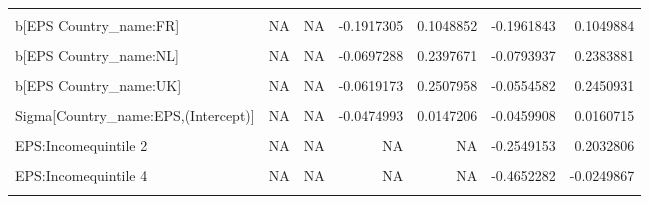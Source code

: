 \begin{table}
\begin{tabular}[t]{lrrrrrr}
\cellcolor{gray!10}{b[EPS Country\_name:CH]} & \cellcolor{gray!10}{NA} & \cellcolor{gray!10}{NA} & \cellcolor{gray!10}{-0.1840604} & \cellcolor{gray!10}{0.1098069} & \cellcolor{gray!10}{-0.1875721} & \cellcolor{gray!10}{0.1005161}\\
b[EPS Country\_name:FR] & NA & NA & -0.1917305 & 0.1048852 & -0.1961843 & 0.1049884\\
\cellcolor{gray!10}{b[EPS Country\_name:IL]} & \cellcolor{gray!10}{NA} & \cellcolor{gray!10}{NA} & \cellcolor{gray!10}{-0.3029172} & \cellcolor{gray!10}{0.2764548} & \cellcolor{gray!10}{-0.2903695} & \cellcolor{gray!10}{0.2643187}\\
b[EPS Country\_name:NL] & NA & NA & -0.0697288 & 0.2397671 & -0.0793937 & 0.2383881\\
\addlinespace
\cellcolor{gray!10}{b[EPS Country\_name:SE]} & \cellcolor{gray!10}{NA} & \cellcolor{gray!10}{NA} & \cellcolor{gray!10}{-0.2553831} & \cellcolor{gray!10}{0.0586896} & \cellcolor{gray!10}{-0.2560886} & \cellcolor{gray!10}{0.0644612}\\
b[EPS Country\_name:UK] & NA & NA & -0.0619173 & 0.2507958 & -0.0554582 & 0.2450931\\
\cellcolor{gray!10}{b[EPS Country\_name:US]} & \cellcolor{gray!10}{NA} & \cellcolor{gray!10}{NA} & \cellcolor{gray!10}{-0.2257754} & \cellcolor{gray!10}{0.1066595} & \cellcolor{gray!10}{-0.2108101} & \cellcolor{gray!10}{0.1042208}\\
Sigma[Country\_name:EPS,(Intercept)] & NA & NA & -0.0474993 & 0.0147206 & -0.0459908 & 0.0160715\\
\cellcolor{gray!10}{Sigma[Country\_name:EPS,EPS]} & \cellcolor{gray!10}{NA} & \cellcolor{gray!10}{NA} & \cellcolor{gray!10}{0.0016993} & \cellcolor{gray!10}{0.0670086} & \cellcolor{gray!10}{0.0013740} & \cellcolor{gray!10}{0.0629157}\\
\addlinespace
EPS:Incomequintile 2 & NA & NA & NA & NA & -0.2549153 & 0.2032806\\
\cellcolor{gray!10}{EPS:Incomequintile 3} & \cellcolor{gray!10}{NA} & \cellcolor{gray!10}{NA} & \cellcolor{gray!10}{NA} & \cellcolor{gray!10}{NA} & \cellcolor{gray!10}{-0.4682143} & \cellcolor{gray!10}{-0.0185617}\\
EPS:Incomequintile 4 & NA & NA & NA & NA & -0.4652282 & -0.0249867\\
\cellcolor{gray!10}{EPS:Incomequintile 5} & \cellcolor{gray!10}{NA} & \cellcolor{gray!10}{NA} & \cellcolor{gray!10}{NA} & \cellcolor{gray!10}{NA} & \cellcolor{gray!10}{-0.4494179} & \cellcolor{gray!10}{-0.0028318}\\
\bottomrule
\end{tabular}
\end{table}

